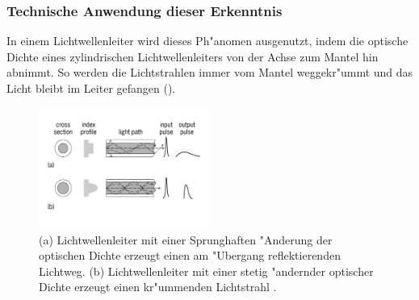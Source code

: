 \subsubsection{Technische Anwendung dieser Erkenntnis}
In einem Lichtwellenleiter wird dieses Ph"anomen ausgenutzt, 
indem  die  optische  Dichte  eines  zylindrischen
Lichtwellenleiters  von  der Achse zum Mantel hin abnimmt.
So werden die Lichtstrahlen immer vom Mantel weggekr"ummt 
und das Licht  bleibt im Leiter gefangen ().
\begin{figure}[H]
\begin{center}
\includegraphics[width=0.5\textwidth]{licht/picture/Lichtwellenleiter.pdf}
	\caption{(a) Lichtwellenleiter mit einer Sprunghaften "Anderung der optischen Dichte erzeugt einen am "Ubergang reflektierenden Lichtweg. 
	(b) Lichtwellenleiter mit einer stetig "andernder optischer Dichte erzeugt einen kr"ummenden Lichtstrahl \cite{opticFibre}. }
	\label{lichtleiter}
\end{center}	
\end{figure}
